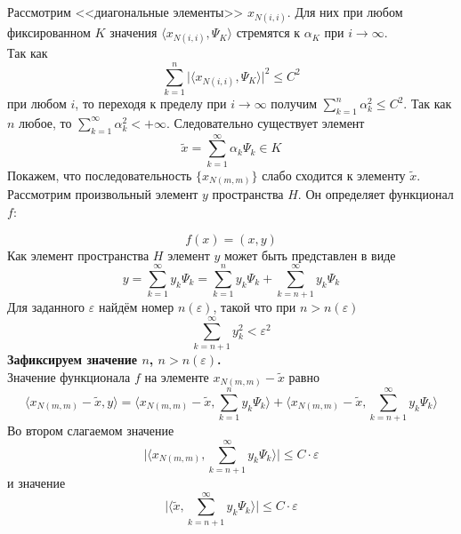 \documentclass[12pt,a4paper,titlepage,oneside]{book}
\theoremstyle{definition}
\theoremstyle{plain}
\theoremstyle{remark}
\theoremstyle{remark}
\theoremstyle{remark}
\theoremstyle{remark}
\theoremstyle{plain}
\theoremstyle{plain}
\begin{document}
 Рассмотрим <<диагональные элементы>> $ x_{N(i,i)}$. Для них при любом фиксированном $K$ значения 
 $ \langle x_{N(i,i)},\Psi_K \rangle $ стремятся к $\alpha_K$ при 
$i \to \infty$.\\
Так как
\begin{equation*}
 \sum\limits_{k=1}^n 
{\vert \langle x_{N(i,i)},\Psi_K \rangle  \vert}^2 \leqslant C^2
\end{equation*}
  при любом $i$, то переходя к пределу при $i\to\infty$ получим $\sum\limits_{k=1}^n \alpha_k^2 \leqslant C^2$. Так как $n$ любое, то $\sum\limits_{k=1}^\infty \alpha_k^2 <+\infty$. Следовательно существует элемент 
\begin{equation*}
\widetilde{x}= \sum\limits_{k=1}^\infty 
\alpha_k\Psi_{k} \in K
\end{equation*}
Покажем, что последовательность
 $\lbrace x_{N(m,m)} \rbrace$
 слабо сходится к элементу $\widetilde{x}$.\\
 Рассмотрим произвольный элемент $y$ пространства 
 $H$. Он определяет функционал $f$:
 
\begin{equation*}
f(x)=(x,y)
\end{equation*}
Как элемент пространства $H$ элемент $y$ может быть представлен в виде 
\begin{equation*}
y=\sum\limits_{k=1}^\infty y_k\Psi_k =
\sum\limits_{k=1}^n y_k\Psi_k +
\sum\limits_{k=n+1}^\infty y_k\Psi_k
\end{equation*}
Для заданного $\varepsilon$ найдём номер $n(\varepsilon)$, такой что при $n>n(\varepsilon)$
\begin{equation*}
\sum\limits_{k=n+1}^\infty y_k^2 < {\varepsilon}^2 
\end{equation*}
\textbf{Зафиксируем значение $n$, $n>n(\varepsilon)$.}\\

Значение функционала $f$ на элементе $x_{N(m,m)}-\widetilde{x}$ равно
\begin{equation*}
 \langle x_{N(m,m)}-\widetilde{x},y \rangle = 
 \langle x_{N(m,m)}-\widetilde{x},\sum\limits_{k=1}^n y_k\Psi_k \rangle +
 \langle x_{N(m,m)}-\widetilde{x},\sum\limits_{k=n+1}^\infty y_k\Psi_k \rangle 
\end{equation*}
Во втором слагаемом значение
\begin{equation*}
\vert  \langle x_{N(m,m)},\sum\limits_{k=n+1}^\infty y_k\Psi_k \rangle  \vert \leqslant
C\cdot\varepsilon
\end{equation*}
и значение 
\begin{equation*}
\vert  \langle \widetilde{x},\sum\limits_{k=n+1}^\infty y_k\Psi_k \rangle  \vert \leqslant
C\cdot\varepsilon
\end{equation*}
\end{document}
